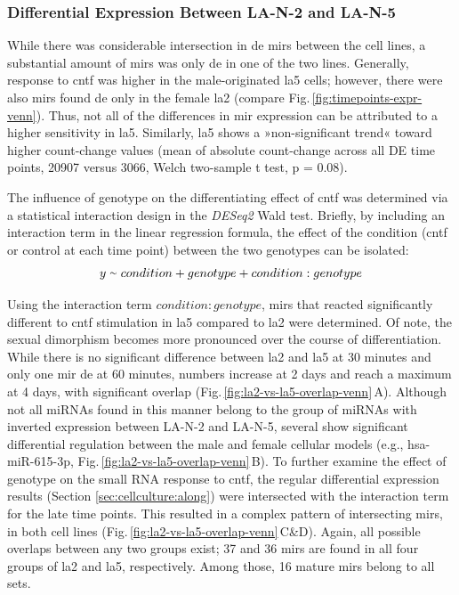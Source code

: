 \subsubsection{Differential Expression Between LA-N-2 and LA-N-5}
While there was considerable intersection in \ac{de} \acp{mir} between the cell lines, a substantial amount of \acp{mir} was only \ac{de} in one of the two lines. Generally, response to \ac{cntf} was higher in the male-originated \ac{la5} cells; however, there were also \acp{mir} found \ac{de} only in the female \ac{la2} (compare Fig.\,\ref{fig:timepoints-expr-venn}). Thus, not all of the differences in \ac{mir} expression can be attributed to a higher sensitivity in \ac{la5}. Similarly, \ac{la5} shows a »non-significant trend« toward higher count-change values (mean of absolute count-change across all DE time points, \num{20907} versus \num{3066}, Welch two-sample t test, p = 0.08).

The influence of genotype on the differentiating effect of \ac{cntf} was determined via a statistical interaction design in the \textit{DESeq2} Wald test. Briefly, by including an interaction term in the linear regression formula, the effect of the condition (\ac{cntf} or control at each time point) between the two genotypes can be isolated: $$y \smallsim condition + genotype + condition:genotype$$

Using the interaction term $condition:genotype$, \acp{mir} that reacted significantly different to \ac{cntf} stimulation in \ac{la5} compared to \ac{la2} were determined. Of note, the sexual dimorphism becomes more pronounced over the course of differentiation. While there is no significant difference between \ac{la2} and \ac{la5} at 30 minutes and only one \ac{mir} \ac{de} at 60 minutes, numbers increase at 2 days and reach a maximum at 4 days, with significant overlap (Fig.\,\ref{fig:la2-vs-la5-overlap-venn}\,A). Although not all miRNAs found in this manner belong to the group of miRNAs with inverted expression between LA-N-2 and LA-N-5, several show significant differential regulation between the male and female cellular models (e.g., hsa-miR-615-3p, Fig.\,\ref{fig:la2-vs-la5-overlap-venn}\,B). To further examine the effect of genotype on the small RNA response to \ac{cntf}, the regular differential expression results (Section \ref{sec:cellculture:along}) were intersected with the interaction term for the late time points. This resulted in a complex pattern of intersecting \acp{mir}, in both cell lines (Fig.\,\ref{fig:la2-vs-la5-overlap-venn}\,C\&D). Again, all possible overlaps between any two groups exist; 37 and 36 \acp{mir} are found in all four groups of \ac{la2} and \ac{la5}, respectively. Among those, 16 mature \acp{mir} belong to all sets.

